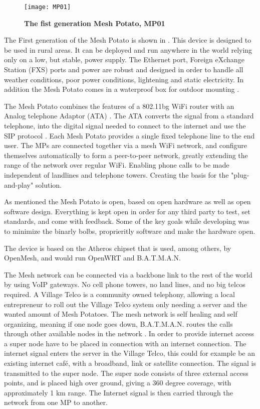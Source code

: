 \begin{figure}[h!]

  \centering
      \texttt{[image: MP01]}
  \caption [The Mesh Potato]{\textbf{The fist generation Mesh Potato, MP01}}
  \label{fig:MP01}
\end{figure}

The First generation of the Mesh Potato is shown in . This device is designed to be used in rural areas. It can be deployed and run anywhere in the world relying only on a low, but stable, power supply. The Ethernet port, Foreign eXchange Station (FXS) ports and power are robust and designed in order to handle all weather conditions, poor power conditions, lightening and static electricity. In addition the Mesh Potato comes in a waterproof box for outdoor mounting \cite{background}.

The Mesh Potato combines the features of a 802.11bg WiFi router with an Analog telephone Adaptor (ATA) \cite{MP}. The ATA converts the signal from a standard telephone, into the digital signal needed to connect to the internet and use the SIP protocol \cite{MParticle}. 
Each Mesh Potato provides a single fixed telephone line to the end user. The MPs are connected together via a mesh WiFi network, and configure themselves automatically to form a peer-to-peer network, greatly extending the range of the network over regular WiFi. Enabling phone calls to be made independent of landlines and telephone towers. Creating the basis for the "plug-and-play" solution. 

As mentioned the Mesh Potato is open, based on open hardware as well as open software design. Everything is kept open in order for any third party to test, set standards, and come with feedback. Some of the key goals while developing was to minimize the binarly bolbs, proprieritly software and make the hardware open. 

The device is based on the Atheros chipset that is used, among others, by OpenMesh, and would run OpenWRT and B.A.T.M.A.N.



The Mesh network can be connected via a backbone link to the rest of the world by using VoIP gateways. No cell phone towers, no land lines, and no big telcos required. A Village Telco is a community owned telephony, allowing a local entrepreneur to roll out the Village Telco system only needing a server and the wanted amount of Mesh Potatoes. The mesh network is self healing and self organizing, meaning if one node goes down, B.A.T.M.A.N. routes the calls through other available nodes in the network \cite{MPbyRowe}. In order to provide internet access a super node have to be placed in connection with an internet connection. The internet signal enters the server in the Village Telco, this could for example be an existing internet café, with a broadband, link or satellite connection. The signal is transmitted to the super node. The super node consists of three external access points, and is placed high over ground, giving a 360 degree coverage, with approximately 1 km range. The Internet signal is then carried through the network from one MP to another. 



